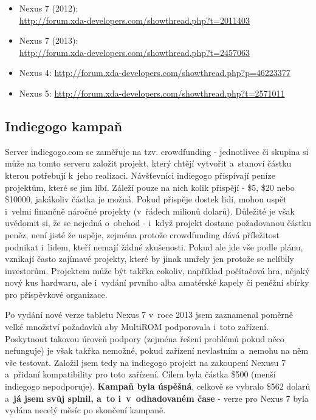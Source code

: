 \documentclass[12pt, a4paper, oneside]{article}
\newcommand{\B}{\textbf} %
\begin{document}
\begin{itemize}
\item Nexus 7 (2012):\\ \url{http://forum.xda-developers.com/showthread.php?t=2011403}
\item Nexus 7 (2013):\\ \url{http://forum.xda-developers.com/showthread.php?t=2457063}
\item Nexus 4: \url{http://forum.xda-developers.com/showthread.php?p=46223377}
\item Nexus 5: \url{http://forum.xda-developers.com/showthread.php?t=2571011}
\end{itemize}

\subsection{Indiegogo kampaň}
Server indiegogo.com\cite{indiegogo} se zaměřuje na tzv. crowdfunding - jednotlivec či skupina si může na tomto serveru založit projekt, který chtějí vytvořit a~stanoví částku kterou potřebují k~jeho realizaci. Návšťevníci indiegogo přispívají peníze projektům, které se jim líbí. Záleží pouze na nich kolik přispějí - \$5, \$20 nebo \$10000, jakákoliv částka je možná. Pokud přispěje dostek lidí, mohou uspět i~velmi finančně náročné projekty (v~řádech milionů dolarů). Důležité je však uvědomit si, že se nejedná o~obchod - i~když projekt dostane požadovanou částku peněz, není jisté že uspěje, zejména protože crowdfunding dává příležitost podnikat i~lidem, kteří nemají žádné zkušenosti. Pokud ale jde vše podle plánu, vznikají často zajímavé projekty, které by jinak umřely jen protože se nelíbily investorům. Projektem může být takřka cokoliv, například počítačová hra, nějaký nový kus hardwaru, ale i~vydání prvního alba amatérské kapely či peněžní sbírky pro příspěvkové organizace.

Po vydání nové verze tabletu Nexus 7 v~roce 2013 jsem zaznamenal poměrně velké množství požadavků aby MultiROM podporovala i~toto zařízení. Poskytnout takovou úroveň podpory (zejména řešení problémů pokud něco nefunguje) je však takřka nemožné, pokud zařízení nevlastním a~nemohu na něm vše testovat. Založil jsem tedy na indiegogo projekt na zakoupení Nexusu 7 a~přidaní kompatibility pro toto zařízení\cite{indiegogo-multirom}. Cílem byla částka \$500 (menší indiegogo nepodporuje). \B{Kampaň byla úspěšná}, celkově se vybralo \$562 dolarů a~\B{já jsem svůj  splnil, a~to i~v~odhadovaném čase} - verze pro Nexus 7 byla vydána necelý měsíc po skončení kampaně.
\end{document}
